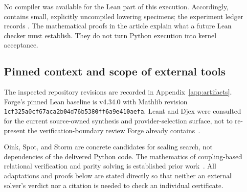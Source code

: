 No compiler was available for the Lean part of this execution. Accordingly,
 contains small, explicitly uncompiled lowering specimens; the
experiment ledger records . The mathematical proofs in the
article explain what a future Lean checker must establish. They do not turn
Python execution into kernel acceptance.

\subsection{Pinned context and scope of external tools}

The inspected repository revisions are recorded in Appendix~\ref{app:artifacts}.
Forge's pinned Lean baseline is v4.34.0 with Mathlib revision
\texttt{1cf325a0cf67aca2b04d76b5380ff6a9e410aefa}. Leant and Djex were consulted
for the current source-owned synthesis and provider-selection surface, not to
re-present the verification-boundary review Forge already
contains~\cite{leant,djex,forge-ideas}.

Oink, Spot, and Storm are concrete candidates for scaling search, not dependencies
of the delivered Python code. The mathematics of coupling-based relational
verification and parity solving is established prior work~\cite{oink,coupling}.
All adaptations and proofs below are stated directly so that neither an external
solver's verdict nor a citation is needed to check an individual certificate.
